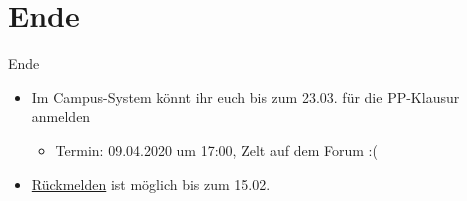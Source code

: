 \documentclass{beamer}
\begin{document}
\section{Ende}

\begin{frame}{Ende}
	\begin{itemize}
		\item Im Campus-System könnt ihr euch bis zum 23.03. für die PP-Klausur anmelden
                \begin{itemize}
                  \item Termin: 09.04.2020 um 17:00, Zelt auf dem Forum :(
                \end{itemize}
		\item \href{https://campus.studium.kit.edu/renewal/payment.php}{Rückmelden} ist möglich bis zum 15.02.
	\end{itemize}
\end{frame}
\end{document}
